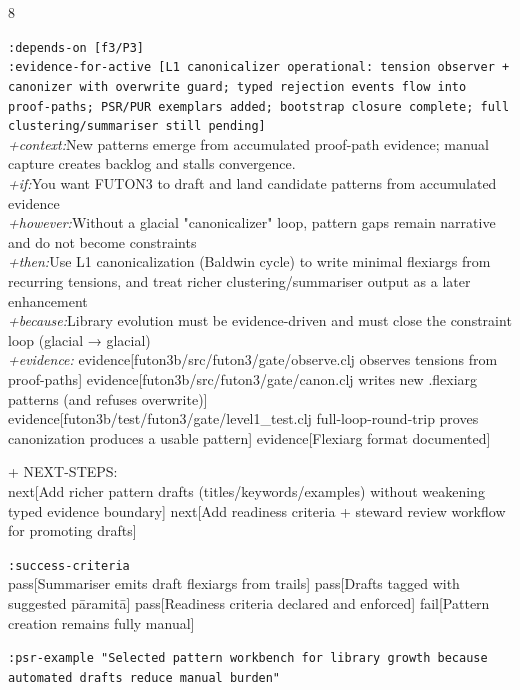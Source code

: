 \documentclass[landscape]{article}
\newcommand{\flexitag}[1]{\textcolor[gray]{0.35}{\textit{#1}}}
\newenvironment{devmapactive}{%
  \def\FrameCommand{\colorbox{devmapactivebg}}%
  \setlength{\fboxsep}{2pt}%
  \MakeFramed{\advance\hsize-\width \FrameRestore}%
}{\endMakeFramed}
\begin{document}
\begin{paracol}{8}
\begin{devmapactive}
  \texttt{:\allowbreak{}depends-\allowbreak{}on [f3/\allowbreak{}P3]}\\
  \texttt{:\allowbreak{}evidence-\allowbreak{}for-\allowbreak{}active [L1 canonicalizer operational:\allowbreak{} tension observer +\allowbreak{} canonizer with overwrite guard;\allowbreak{} typed rejection events flow into proof-\allowbreak{}paths;\allowbreak{} PSR/\allowbreak{}PUR exemplars added;\allowbreak{} bootstrap closure complete;\allowbreak{} full clustering/\allowbreak{}summariser still pending]}\\
  \flexitag{+context:}New patterns emerge from accumulated proof-path evidence; manual capture creates backlog and stalls convergence.\\
  \flexitag{+if:}You want FUTON3 to draft and land candidate patterns from accumulated evidence\\
  \flexitag{+however:}Without a glacial "canonicalizer" loop, pattern gaps remain narrative and do not become constraints\\
  \flexitag{+then:}Use L1 canonicalization (Baldwin cycle) to write minimal flexiargs from recurring tensions, and treat richer clustering/summariser output as a later enhancement\\
  \flexitag{+because:}Library evolution must be evidence-driven and must close the constraint loop (glacial → glacial)\\
  \flexitag{+evidence:} evidence[futon3b/src/futon3/gate/observe.clj observes tensions from proof-paths] evidence[futon3b/src/futon3/gate/canon.clj writes new .flexiarg patterns (and refuses overwrite)] evidence[futon3b/test/futon3/gate/level1\_test.clj full-loop-round-trip proves canonization produces a usable pattern] evidence[Flexiarg format documented]\\
\par
  + NEXT-STEPS:\\
    next[Add richer pattern drafts (titles/keywords/examples) without weakening typed evidence boundary] next[Add readiness criteria + steward review workflow for promoting drafts]\\
\par
  \texttt{:\allowbreak{}success-\allowbreak{}criteria}\\
    pass[Summariser emits draft flexiargs from trails] pass[Drafts tagged with suggested pāramitā] pass[Readiness criteria declared and enforced] fail[Pattern creation remains fully manual]\\
\par
  \texttt{:\allowbreak{}psr-\allowbreak{}example "Selected pattern workbench for library growth because automated drafts reduce manual burden"}\\

\end{devmapactive}
\end{paracol}
\end{document}

